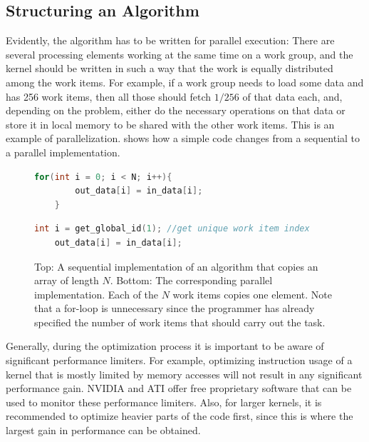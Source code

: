 \documentclass[11pt,twoside]{report}
\begin{document}

\subsection{Structuring an Algorithm}
Evidently, the algorithm has to be written for parallel execution: There are several processing elements working at the same time on a work group, and the kernel should be written in such a way  that the work is equally distributed among the work items. For example, if a work group needs to load some data and has 256 work items, then all those should fetch $1/256$ of that data each, and, depending on the problem, either do the necessary operations on that data or store it in local memory to be shared with the other work items. This is an example of parallelization.  shows how a simple code changes from a sequential to a parallel implementation. 

\begin{figure}[htbp]
	\vspace{-20pt}
	\begin{center}
	\begin{lstlisting}[language=C, style=my_C]
	for(int i = 0; i < N; i++){
		out_data[i] = in_data[i];
	}
	\end{lstlisting}
	\vspace{-20pt}
	\begin{lstlisting}[language=C, style=my_C]
	int i = get_global_id(1); //get unique work item index
	out_data[i] = in_data[i];
	\end{lstlisting}
\caption{Top: A sequential implementation of an algorithm that copies an array of length $N$. Bottom: The corresponding parallel implementation. Each of the $N$ work items copies one element. Note that a for-loop is unnecessary since the programmer has already specified the number of work items that should carry out the task. \label{code:parallel}}
\end{center}

\end{figure}


\indent Generally, during the optimization process it is important to be aware of significant performance limiters. For example, optimizing instruction usage of a kernel that is mostly limited by memory accesses will not result in any significant performance gain. NVIDIA and ATI offer free proprietary software that can be used to monitor these performance limiters. Also, for larger kernels, it is recommended to  optimize heavier parts of the code first, since this is where the largest gain in performance can be obtained. 
\end{document}
